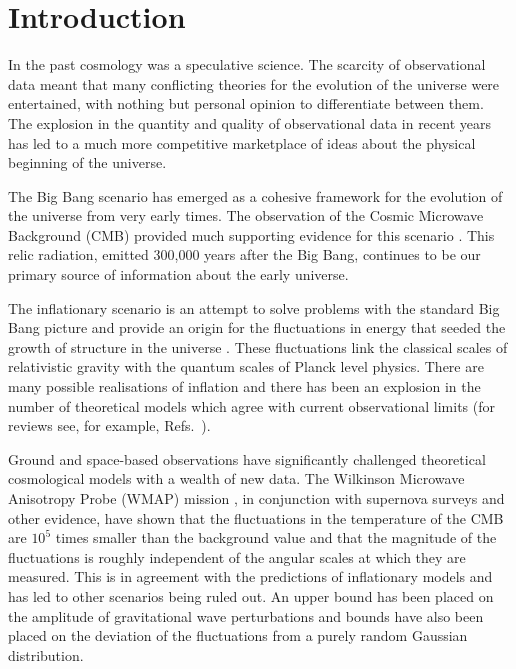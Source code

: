 %


\chapter{Introduction}
\label{ch:shortintro}
In the past cosmology was a speculative science. The scarcity of observational
data meant that many conflicting theories for the evolution of the universe were
entertained, with nothing but personal opinion to differentiate between them.
The explosion in the quantity and quality of observational data in recent years
has led to a much more competitive marketplace of ideas about the physical
beginning of the universe.

The Big Bang scenario has emerged as a cohesive framework for the evolution of
the universe from very early times. The observation of the Cosmic
Microwave Background (CMB) provided much supporting evidence for this scenario
\cite{book:kolbturner}. This
relic radiation, emitted 300,000 years after the Big Bang, continues to
be our primary source of information about the early universe.

The inflationary scenario is an attempt to solve problems with the standard Big
Bang picture and provide an origin for the fluctuations in energy that seeded
the growth of structure in the universe
\cite{Starobinsky:1980te,Guth:1980zm,Albrecht:1982wi,Linde:1981mu,
Starobinsky:1982ee}. These fluctuations link the classical scales of
relativistic gravity with the quantum scales of Planck level physics. There are
many possible realisations of inflation and there has been an explosion in the
number of theoretical models which agree with current observational limits
(for reviews see, for example, Refs.~\cite{book:liddle, Alabidi:2008ej,
Baumann2009}).

Ground and space-based observations have significantly challenged theoretical
cosmological models with a wealth of new data. The Wilkinson Microwave
Anisotropy Probe (WMAP) mission \cite{Komatsu:2008hk}, in conjunction with supernova
surveys and other evidence, have shown that the fluctuations in
the temperature of the CMB are $10^{5}$ times smaller than the background value
and that the magnitude of the fluctuations is roughly independent of the
angular scales at which they are measured. This is in agreement with the
predictions of inflationary models and has led to other scenarios being ruled
out. An upper bound has been placed
on the amplitude of gravitational wave perturbations and bounds have also been
placed on the deviation of the fluctuations from a purely random Gaussian
distribution.


